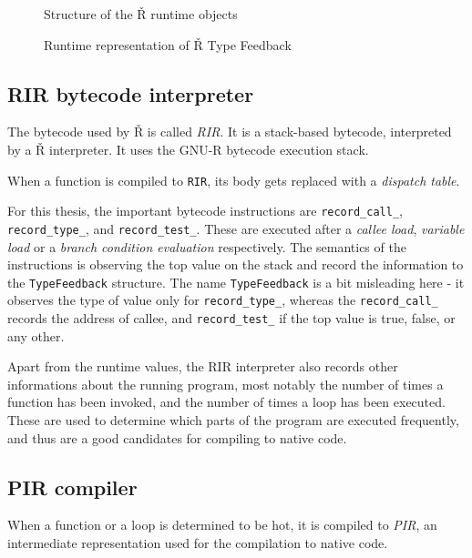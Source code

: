 \begin{figure}
	\centering
  \caption{Structure of the Ř runtime objects}\label{fig:rsh-object-struct}
\end{figure}

\begin{figure}
	\centering
  \caption{Runtime representation of Ř Type Feedback}\label{fig:rsh-tf-struct}
\end{figure}

\subsection{RIR bytecode interpreter}

The bytecode used by Ř is called \textit{RIR}. It is a stack-based bytecode, interpreted by a Ř interpreter. It uses the GNU-R bytecode execution stack.

When a function is compiled to \texttt{RIR}, its body gets replaced with a \textit{dispatch table}.


For this thesis, the important bytecode instructions are \texttt{record\_call\_}, \texttt{record\_type\_}, and \texttt{record\_test\_}. These are executed after a \textit{callee load}, \textit{variable load} or a \textit{branch condition evaluation} respectively. The semantics of the instructions is observing the top value on the stack and record the information to the  \texttt{TypeFeedback} structure. The name \texttt{TypeFeedback} is a bit misleading here - it observes the type of value only for \texttt{record\_type\_}, whereas the \texttt{record\_call\_} records the address of callee, and \texttt{record\_test\_} if the top value is true, false, or any other.

Apart from the runtime values, the RIR interpreter also records other informations about the running program, most notably the number of times a function has been invoked, and the number of times a loop has been executed. These are used to determine which parts of the program are executed frequently, and thus are a good candidates for compiling to native code.

\subsection{PIR compiler}
When a function or a loop is determined to be hot, it is compiled to \textit{PIR}, an intermediate representation used for the compilation to native code.

